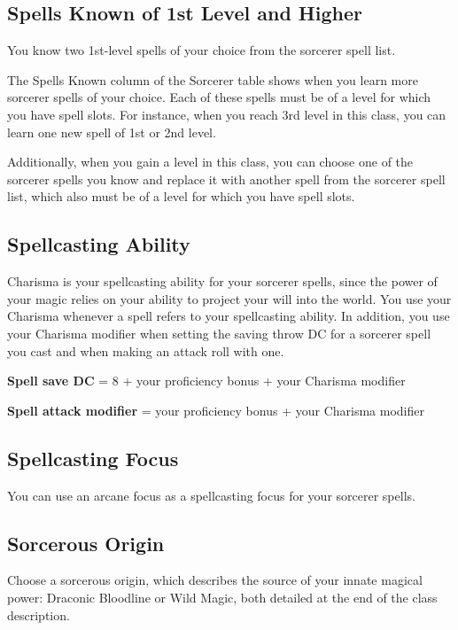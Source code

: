 \subsection{Spells Known of 1st Level and Higher}

You know two 1st-level spells of your choice from the sorcerer spell list.

The Spells Known column of the Sorcerer table shows when you learn more sorcerer spells of your choice. Each of these spells must be of a level for which you have spell slots. For instance, when you reach 3rd level in this class, you can learn one new spell of 1st or 2nd level.

Additionally, when you gain a level in this class, you can choose one of the sorcerer spells you know and replace it with another spell from the sorcerer spell list, which also must be of a level for which you have spell slots.

\subsection{Spellcasting Ability}

Charisma is your spellcasting ability for your sorcerer spells, since the power of your magic relies on your ability to project your will into the world. You use your Charisma whenever a spell refers to your spellcasting ability. In addition, you use your Charisma modifier when setting the saving throw DC for a sorcerer spell you cast and when making an attack roll with one.

\textbf{Spell save DC} = 8 + your proficiency bonus + your Charisma modifier

\textbf{Spell attack modifier} = your proficiency bonus + your Charisma modifier

\subsection{Spellcasting Focus}

You can use an arcane focus as a spellcasting focus for your sorcerer spells.

\subsection{Sorcerous Origin}

Choose a sorcerous origin, which describes the source of your innate magical power: Draconic Bloodline or Wild Magic, both detailed at the end of the class description.

